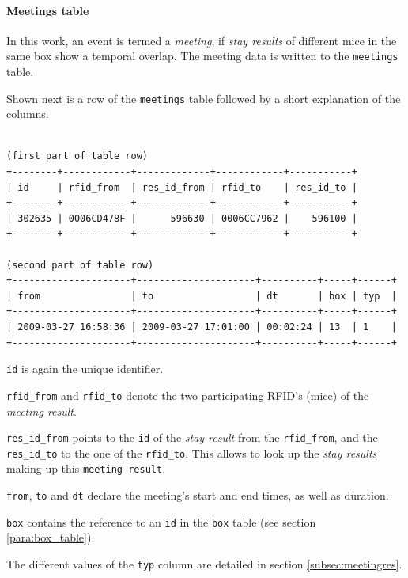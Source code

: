 \paragraph{Meetings table}
\label{para:meetings_table}

In this work, an event is termed a \textit{meeting}, if \textit{stay results} of different mice in the same box show a temporal overlap. The meeting data is written to the \lstinline|meetings| table.

Shown next is a row of the \lstinline|meetings| table followed by a short explanation of the columns.

\codescript
{}
\begin{lstlisting}[frame=none]

(first part of table row)
+--------+------------+-------------+------------+-----------+
| id     | rfid_from  | res_id_from | rfid_to    | res_id_to |
+--------+------------+-------------+------------+-----------+
| 302635 | 0006CD478F |      596630 | 0006CC7962 |    596100 | 
+--------+------------+-------------+------------+-----------+

(second part of table row)
+---------------------+---------------------+----------+-----+------+
| from                | to                  | dt       | box | typ  |
+---------------------+---------------------+----------+-----+------+
| 2009-03-27 16:58:36 | 2009-03-27 17:01:00 | 00:02:24 | 13  | 1    |
+---------------------+---------------------+----------+-----+------+
\end{lstlisting}

\begin{mydesc}
\item \lstinline|id| is again the unique identifier.
\item \lstinline|rfid_from| and \lstinline|rfid_to| denote the two participating RFID's (mice) of the \textit{meeting result}.
\item \lstinline|res_id_from| points to the \lstinline|id| of the \textit{stay result} from the \lstinline|rfid_from|, and the \lstinline|res_id_to| to the one of the \lstinline|rfid_to|. This allows to look up the \textit{stay results} making up this \lstinline|meeting result|.
\item \lstinline|from|, \lstinline|to| and \lstinline|dt| declare the meeting's start and end times, as well as duration.
\item \lstinline|box| contains the reference to an \lstinline|id| in the \lstinline|box| table (see section \ref{para:box_table}).
\item The different values of the \lstinline|typ| column are detailed in section \ref{subsec:meetingres}.
\end{mydesc}

